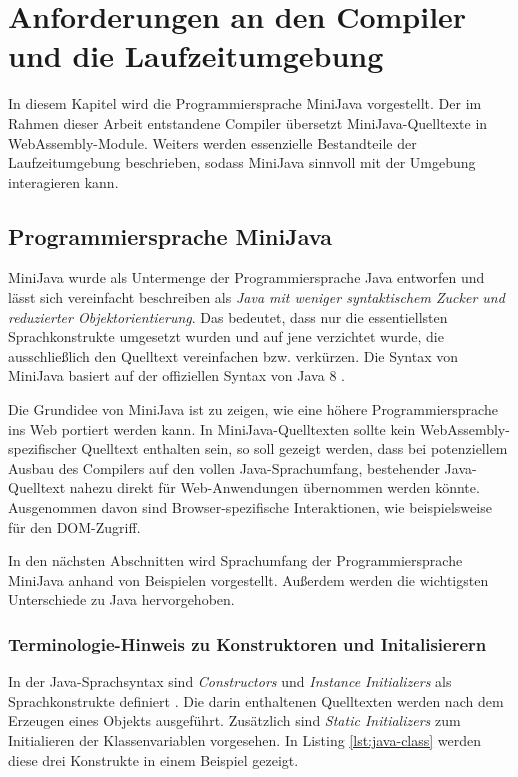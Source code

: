 \chapter{Anforderungen an den Compiler und die Laufzeitumgebung}

In diesem Kapitel wird die Programmiersprache MiniJava vorgestellt. Der im Rahmen dieser Arbeit entstandene Compiler übersetzt MiniJava-Quelltexte in WebAssembly-Module. Weiters werden essenzielle Bestandteile der Laufzeitumgebung beschrieben, sodass MiniJava sinnvoll mit der Umgebung interagieren kann.

\section{Programmiersprache MiniJava}

MiniJava wurde als Untermenge der Programmiersprache Java entworfen und lässt sich vereinfacht beschreiben als \emph{Java mit weniger syntaktischem Zucker und reduzierter Objektorientierung}. Das bedeutet, dass nur die essentiellsten Sprachkonstrukte umgesetzt wurden und auf jene verzichtet wurde, die ausschließlich den Quelltext vereinfachen bzw. verkürzen. Die Syntax von MiniJava basiert auf der offiziellen Syntax von Java 8 \cite{Java8Specification}.

Die Grundidee von MiniJava ist zu zeigen, wie eine höhere Programmiersprache ins Web portiert werden kann. In MiniJava-Quelltexten sollte kein WebAssembly-spezifischer Quelltext enthalten sein, so soll gezeigt werden, dass bei potenziellem Ausbau des Compilers auf den vollen Java-Sprachumfang, bestehender Java-Quelltext nahezu direkt für Web-Anwendungen übernommen werden könnte. Ausgenommen davon sind Browser-spezifische Interaktionen, wie beispielsweise für den DOM-Zugriff.

In den nächsten Abschnitten wird Sprachumfang der Programmiersprache MiniJava anhand von Beispielen vorgestellt. Außerdem werden die wichtigsten Unterschiede zu Java hervorgehoben.

\subsection{Terminologie-Hinweis zu Konstruktoren und Initalisierern}

In der Java-Sprachsyntax sind \emph{Constructors} und \emph{Instance Initializers} als Sprachkonstrukte definiert \cite{Java8Specification}. Die darin enthaltenen Quelltexten werden nach dem Erzeugen eines Objekts ausgeführt. Zusätzlich sind \emph{Static Initializers} zum Initialieren der Klassenvariablen vorgesehen. In Listing \ref{lst:java-class} werden diese drei Konstrukte in einem Beispiel gezeigt.

